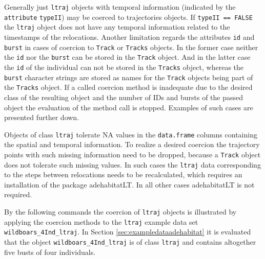 \documentclass[12pt, oneside, a4paper]{scrbook}
\newcommand{\pkg}[1]{{\normalfont\fontseries{b}\selectfont #1}}
\let\code=\texttt
\begin{document}
Generally just \code{ltraj} objects with temporal information (indicated by the \code{attribute} \code{typeII}) may be coerced to \pkg{trajectories} objects. If \code{typeII == FALSE} the \code{ltraj} object does not have any temporal information related to the timestamps of the relocations. 
Another limitation regards the attributes \code{id} and \code{burst} in cases of coercion to \code{Track} or \code{Tracks} objects. In the former case neither the \code{id} nor the \code{burst} can be stored in the \code{Track} object. And in the latter case the \code{id} of the individual can not be stored in the \code{Tracks} object, whereas the \code{burst} character strings are stored as names for the \code{Track} objects being part of the \code{Tracks} object.
If a called coercion method is inadequate due to the desired class of the resulting object and the number of IDs and bursts of the passed object the evaluation of the method call is stopped. Examples of such cases are presented further down.
\par\medskip

Objects of class \code{ltraj} tolerate NA values in the \code{data.frame} columns containing the spatial and temporal information. To realize a desired coercion the trajectory points with such missing information need to be dropped, because a \code{Track} object does not tolerate such missing values.
In such cases the \code{ltraj} data corresponding to the steps between relocations needs to be recalculated, which requires an installation of the package \pkg{adehabitatLT}. In all other cases \pkg{adehabitatLT} is not required.
\par\medskip

By the following commands the coercion of \code{ltraj} objects is illustrated by applying the coercion methods to the \code{ltraj} example data set \code{wildboars\_4Ind\_ltraj}. In Section \ref{sec:exampledataadehabitat} it is evaluated that the object \code{wildboars\_4Ind\_ltraj} is of class \code{ltraj} and contains altogether five busts of four individuals.
\par\medskip
\end{document}
